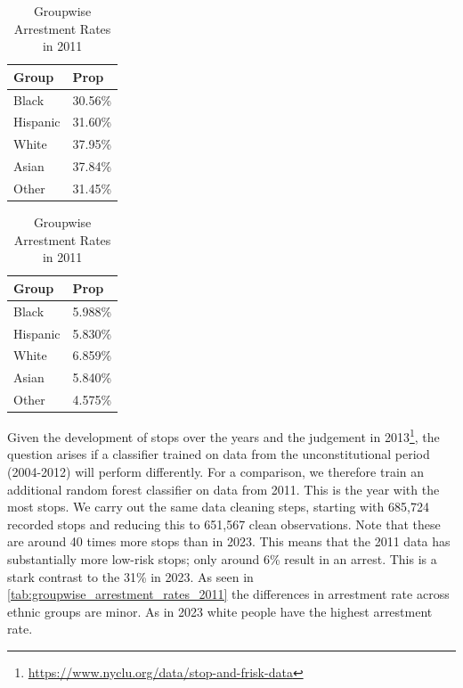 \begin{table}[!h]
    \centering
    \begin{minipage}{0.48\linewidth}
        \centering
        \begin{tabular}{|ll|}
            \hline
            Group & Prop \\ 
            \hline
            Black & 30.56\% \\ 
            Hispanic & 31.60\% \\ 
            White & 37.95\% \\ 
            Asian & 37.84\% \\ 
            Other & 31.45\% \\ 
            \hline
        \end{tabular}
        \caption{Groupwise Arrestment Rates in 2023} 
        \label{tab:groupwise_arrestment_rates_2023}
    \end{minipage}
    \hfill
    \begin{minipage}{0.48\linewidth}
        \centering
        \begin{tabular}{|ll|}
            \hline
            Group & Prop \\ 
            \hline
            Black & 5.988\% \\ 
            Hispanic & 5.830\% \\ 
            White & 6.859\% \\ 
            Asian & 5.840\% \\ 
            Other & 4.575\% \\ 
            \hline
        \end{tabular}
        \caption{Groupwise Arrestment Rates in 2011} 
        \label{tab:groupwise_arrestment_rates_2011}
    \end{minipage}
\end{table}


    
Given the development of stops over the years and the judgement in 2013\footnote{\href{https://www.nyclu.org/data/stop-and-frisk-data}{https://www.nyclu.org/data/stop-and-frisk-data}}, the question arises if a classifier trained on data from the unconstitutional period (2004-2012) will perform differently.
For a comparison, we therefore train an additional random forest classifier on data from 2011. This is the year with the most stops. We carry out the same data cleaning steps, starting with 685,724 recorded stops and reducing this to 651,567 clean observations. Note that these are around 40 times more stops than in 2023.
This means that the 2011 data has substantially more low-risk stops; only around 6\% result in an arrest. This is a stark contrast to the 31\% in 2023. As seen in \autoref{tab:groupwise_arrestment_rates_2011} the differences in arrestment rate across ethnic groups are minor. As in 2023 white people have the highest arrestment rate.\\

